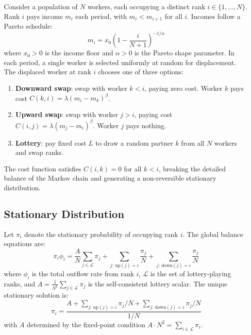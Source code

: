 \documentclass[12pt,a4paper]{article}
\begin{document}
Consider a population of $N$ workers, each occupying a distinct rank
$i \in \{1, \ldots, N\}$. Rank $i$ pays income $m_i$ each period, with
$m_i < m_{i+1}$ for all $i$. Incomes follow a Pareto schedule:
\begin{equation}
  m_i = x_0 \left(1 - \frac{i}{N+1}\right)^{-1/\alpha}
  \label{eq:pareto}
\end{equation}
where $x_0 > 0$ is the income floor and $\alpha > 0$ is the Pareto shape parameter.
In each period, a single worker is selected uniformly at random for displacement.
The displaced worker at rank $i$ chooses one of three options:
\begin{enumerate}
  \item \textbf{Downward swap}: swap with worker $k < i$, paying zero cost. Worker $k$ pays cost $C(k,i) = \lambda(m_i - m_k)^\beta$.
  \item \textbf{Upward swap}: swap with worker $j > i$, paying cost $C(i,j) = \lambda(m_j - m_i)^\beta$. Worker $j$ pays nothing.
  \item \textbf{Lottery}: pay fixed cost $L$ to draw a random partner $k$ from all $N$ workers and swap ranks.
\end{enumerate}
The cost function satisfies $C(i,k) = 0$ for all $k < i$, breaking the detailed
balance of the Markov chain and generating a non-reversible stationary distribution.

\subsection{Stationary Distribution}

Let $\pi_i$ denote the stationary probability of occupying rank $i$.
The global balance equations are:
\begin{equation}
  \pi_i \phi_i = \frac{A}{N} \sum_{j \in \mathcal{L}} \pi_j
  + \sum_{j:\,\mathrm{up}(j)=i} \frac{\pi_j}{N}
  + \sum_{j:\,\mathrm{down}(j)=i} \frac{\pi_j}{N}
\end{equation}
where $\phi_i$ is the total outflow rate from rank $i$,
$\mathcal{L}$ is the set of lottery-playing ranks, and
$A = \frac{1}{N^2}\sum_{j \in \mathcal{L}} \pi_j$ is the self-consistent
lottery scalar. The unique stationary solution is:
\begin{equation}
  \pi_i = \frac{A + \sum_{j:\,\mathrm{up}(j)=i} \pi_j/N
               + \sum_{j:\,\mathrm{down}(j)=i} \pi_j/N}{1/N}
\end{equation}
with $A$ determined by the fixed-point condition
$A \cdot N^2 = \sum_{i \in \mathcal{L}} \pi_i$.
\end{document}
